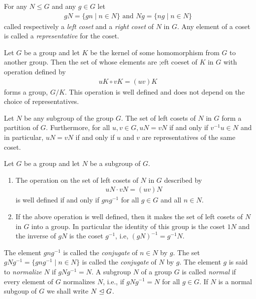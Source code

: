 \documentclass[../main]{subfiles}
\begin{document}
 
 \begin{dfn}
  For any $N\leq G$ and any $g\in G$ let 
  \begin{align*}
   gN=\{gn \mid n\in N\} \text{ and } Ng=\{ng \mid n\in N\}
   \end{align*}
  called respectively a \textit{left coset} and a \textit{right coset} of $N$ in $G$. Any element of a coset is called a \textit{representative} for the coset.
 \end{dfn}
 
 
 \begin{thm}
  Let $G$ be a group and let $K$ be the kernel of some homomorphism from $G$ to another group. Then the set of whose elements are ;eft coeset of $K$ in $G$ with operation defined by 
  \begin{align*}
   uK\circ vK = (uv)K
  \end{align*}
  forms a group, $G/K$. This operation is well defined and does not depend on the choice of representatives. 
 \end{thm}
 
 
 \begin{prop}
  Let $N$ be any subgroup of the group $G$. The set of left cosets of $N$ in $G$ form a partition of $G$. Furthermore, for all $u,v\in G, uN=vN$ if and only if $v^{-1}u\in N$ and in particular, $uN = vN$ if and only if $u$ and $v$ are representatives of the same coset.
  \end{prop}
  
  
  \begin{prop}
   Let $G$ be a group and let $N$ be a subgroup of $G$. 
   \begin{enumerate}
    \item The operation on the set of left cosets of $N$ in $G$ described by
    \begin{align*}
     uN\cdot vN =(uv)N
    \end{align*}
    is well defined if and only if $gng^{-1}$ for all $g\in G$ and all $n\in N $. 
    \item If the above operation is well defined, then it makes the set of left cosets of $N$ in $G$ into a group. In particular the identity of this group is the coset $1N$ and the inverse of $gN$ is the coset $g^{-1}$, i.e, $(gN)^{-1} = g^{-1}N$.
   \end{enumerate}
  \end{prop}
  
  
  
  \begin{dfn}
   The element $gng^{-1}$ is called the \textit{conjugate} of $n\in N$ by $g$. The set $gNg^{-1}=\{gng^{-1}\mid n\in N\}$ is called the \textit{conjugate} of $N$ by $g$. The element $g$ is said to \textit{normalize} $N$ if $gNg^{-1} = N$. A subgroup $N$ of a group $G$ is called \textit{normal} if every element of $G$ normalizes $N$, i.e., if $gNg^{-1} = N$ for all $g\in G$. If $N$ is a normal subgoup of $G$ we shall write $N \trianglelefteq G$. 
  \end{dfn}
  
\end{document}
